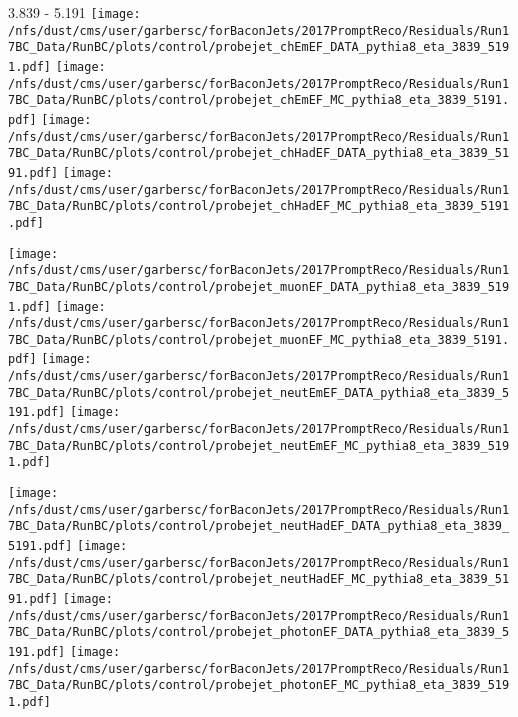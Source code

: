 \documentclass[t,compress]{beamer}
\begin{document}
\begin{frame}{3.839 - 5.191}
	\texttt{[image: /nfs/dust/cms/user/garbersc/forBaconJets/2017PromptReco/Residuals/Run17BC\_Data/RunBC/plots/control/probejet\_chEmEF\_DATA\_pythia8\_eta\_3839\_5191.pdf]}
	\texttt{[image: /nfs/dust/cms/user/garbersc/forBaconJets/2017PromptReco/Residuals/Run17BC\_Data/RunBC/plots/control/probejet\_chEmEF\_MC\_pythia8\_eta\_3839\_5191.pdf]}
	\texttt{[image: /nfs/dust/cms/user/garbersc/forBaconJets/2017PromptReco/Residuals/Run17BC\_Data/RunBC/plots/control/probejet\_chHadEF\_DATA\_pythia8\_eta\_3839\_5191.pdf]}
	\texttt{[image: /nfs/dust/cms/user/garbersc/forBaconJets/2017PromptReco/Residuals/Run17BC\_Data/RunBC/plots/control/probejet\_chHadEF\_MC\_pythia8\_eta\_3839\_5191.pdf]}
\newline

\vspace{-0.65cm}
	\texttt{[image: /nfs/dust/cms/user/garbersc/forBaconJets/2017PromptReco/Residuals/Run17BC\_Data/RunBC/plots/control/probejet\_muonEF\_DATA\_pythia8\_eta\_3839\_5191.pdf]}
	\texttt{[image: /nfs/dust/cms/user/garbersc/forBaconJets/2017PromptReco/Residuals/Run17BC\_Data/RunBC/plots/control/probejet\_muonEF\_MC\_pythia8\_eta\_3839\_5191.pdf]}
	\texttt{[image: /nfs/dust/cms/user/garbersc/forBaconJets/2017PromptReco/Residuals/Run17BC\_Data/RunBC/plots/control/probejet\_neutEmEF\_DATA\_pythia8\_eta\_3839\_5191.pdf]}
	\texttt{[image: /nfs/dust/cms/user/garbersc/forBaconJets/2017PromptReco/Residuals/Run17BC\_Data/RunBC/plots/control/probejet\_neutEmEF\_MC\_pythia8\_eta\_3839\_5191.pdf]}
\newline

\vspace{-0.65cm}
	\texttt{[image: /nfs/dust/cms/user/garbersc/forBaconJets/2017PromptReco/Residuals/Run17BC\_Data/RunBC/plots/control/probejet\_neutHadEF\_DATA\_pythia8\_eta\_3839\_5191.pdf]}
	\texttt{[image: /nfs/dust/cms/user/garbersc/forBaconJets/2017PromptReco/Residuals/Run17BC\_Data/RunBC/plots/control/probejet\_neutHadEF\_MC\_pythia8\_eta\_3839\_5191.pdf]}
	\texttt{[image: /nfs/dust/cms/user/garbersc/forBaconJets/2017PromptReco/Residuals/Run17BC\_Data/RunBC/plots/control/probejet\_photonEF\_DATA\_pythia8\_eta\_3839\_5191.pdf]}
	\texttt{[image: /nfs/dust/cms/user/garbersc/forBaconJets/2017PromptReco/Residuals/Run17BC\_Data/RunBC/plots/control/probejet\_photonEF\_MC\_pythia8\_eta\_3839\_5191.pdf]}
\end{frame}
\end{document}
